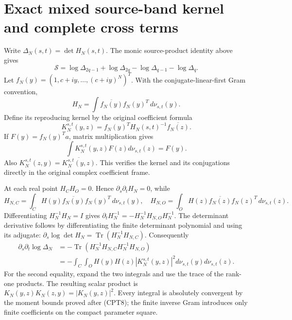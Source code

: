 \documentclass[11pt]{article}
\newcommand{\Scal}{\mathcal S}
\DeclareMathOperator{\Tr}{Tr}
\begin{document}
\section{Exact mixed source-band kernel and complete cross terms}

Write \(\Delta_N(s,t)=\det H_N(s,t)\).
The monic source-product identity above gives
\begin{equation}\tag{CPT37}
 \Scal=
 \log\Delta_{2q-1}+\log\Delta_{2q}
          -\log\Delta_{q-1}-\log\Delta_q.
\end{equation}
Let \(f_N(y)=(1,c+iy,\ldots,(c+iy)^N)^T\).
With the conjugate-linear-first Gram convention,
\[
 H_N=\int\overline{f_N(y)}f_N(y)^T\,d\nu_{s,t}(y).
\]
Define its reproducing kernel by the original coefficient formula
\begin{equation}\tag{CPT38}
 K_N^{s,t}(y,z)
   =f_N(y)^T H_N(s,t)^{-1}\overline{f_N(z)}.
\end{equation}
If \(F(y)=f_N(y)^Ta\), matrix multiplication gives
\[
 \int K_N^{s,t}(y,z)F(z)d\nu_{s,t}(z)=F(y).
\]
Also \(K_N^{s,t}(z,y)=\overline{K_N^{s,t}(y,z)}\).
This verifies the kernel and its conjugations directly in the
original complex coefficient frame.

At each real point \(H_CH_O=0\).  Hence
\(\partial_s\partial_tH_N=0\), while
\[
 H_{N,C}=\int_C H(y)\overline{f_N(y)}f_N(y)^T\,d\nu_{s,t}(y),
 \quad
 H_{N,O}=\int_O H(z)\overline{f_N(z)}f_N(z)^T\,d\nu_{s,t}(z).
\]
Differentiating \(H_N^{-1}H_N=I\) gives
\(\partial_tH_N^{-1}=-H_N^{-1}H_{N,O}H_N^{-1}\).
The determinant derivative follows by differentiating the
finite determinant polynomial and using its adjugate:
\(\partial_s\log\det H_N=\Tr(H_N^{-1}H_{N,C})\).
Consequently
\begin{equation}\tag{CPT39}
\begin{split}
 \partial_s\partial_t\log\Delta_N
 &=-\Tr(H_N^{-1}H_{N,C}H_N^{-1}H_{N,O})\\
 &=-\int_C\int_O H(y)H(z)|K_N^{s,t}(y,z)|^2
                          d\nu_{s,t}(y)d\nu_{s,t}(z).
\end{split}
\end{equation}
For the second equality, expand the two integrals and use the
trace of the rank-one products.  The resulting scalar product
is \(K_N(y,z)K_N(z,y)=|K_N(y,z)|^2\).
Every integral is absolutely convergent by the moment bounds
proved after (CPT8); the finite inverse Gram introduces only
finite coefficients on the compact parameter square.
\end{document}
